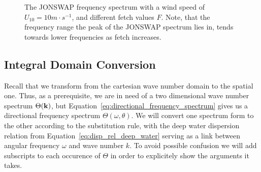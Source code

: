 \begin{figure}
\centering
{}
\caption{The JONSWAP frequency spectrum with a wind speed of $U_{10} = 10m\cdot 
s^{-1}$, and different fetch values $F$. Note, that the frequency range the 
peak of the JONSWAP spectrum lies in, tends towards lower frequencies as fetch 
increases.}
\label{fig:jonswap_spectra_10}
\end{figure}
%
\subsection{Integral Domain Conversion}
Recall that we transform from the cartesian wave number domain to the spatial 
one. Thus, as a prerequisite, we are in need of a two dimensional wave number 
spectrum $\Theta(\mathbf{k})$, but 
Equation~\ref{eq:directional_frequency_spectrum} 
gives us a directional frequency spectrum $\Theta(\omega,\theta)$. We will 
convert one spectrum form to the other according to the substitution rule, with 
the deep water dispersion relation from Equation~\ref{eq:disp_rel_deep_water} 
serving as a link between angular frequency $\omega$ and wave number $k$. To 
avoid possible confusion we will add subscripts to each occurence of $\Theta$ 
in order to explicitely show the arguments it takes.\\

